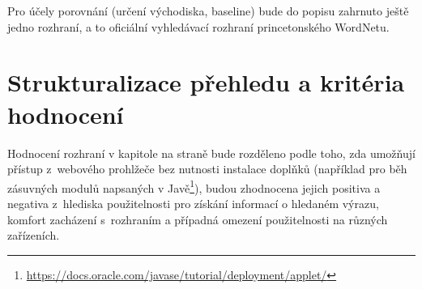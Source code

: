 \documentclass[a4paper, 11pt, oneside, showtrims]{book}
\newcommand{\itNameRef}[1]{\textit{\nameref{#1}}}
\begin{document}

				Pro účely porovnání (určení východiska, baseline) bude do popisu zahrnuto ještě jedno rozhraní, a to oficiální vyhledávací rozhraní princetonského WordNetu.

			\section{Strukturalizace přehledu a kritéria hodnocení}
			\label{cha:structhodnoc}

				Hodnocení rozhraní v kapitole \itNameRef{cha:porovnani} na straně \pageref{cha:porovnani} bude rozděleno podle toho, zda umožňují přístup z~webového prohlžeče bez nutnosti instalace doplňků (například pro běh zásuvných modulů napsaných v Javě\footnote{\url{https://docs.oracle.com/javase/tutorial/deployment/applet/}}), budou zhodnocena jejich positiva a negativa z~hlediska použitelnosti pro získání informací o hledaném výrazu, komfort zacházení s~rozhraním a případná omezení použitelnosti na různých zařízeních. 
\end{document}
